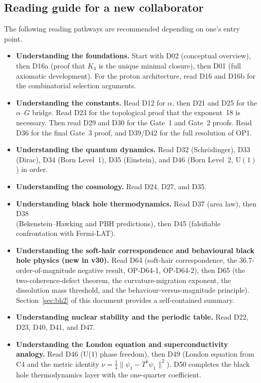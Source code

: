 \documentclass[11pt,a4paper]{article}
\theoremstyle{plain}
\theoremstyle{definition}
\theoremstyle{remark}
\begin{document}
\subsection{Reading guide for a new collaborator}
\label{subsec:readingguide}
The following reading pathways are recommended depending on one's entry point.

\begin{itemize}
\item \textbf{Understanding the foundations.} Start with D02 (conceptual overview), then D16a (proof that $K_4$ is the unique minimal closure), then D01 (full axiomatic development). For the proton architecture, read D16 and D16b for the combinatorial selection arguments.
\item \textbf{Understanding the constants.} Read D12 for $\alpha$, then D21 and D25 for the $\alpha$--$G$ bridge. Read D23 for the topological proof that the exponent~18 is necessary. Then read D29 and D30 for the Gate~1 and Gate~2 proofs. Read D36 for the final Gate~3 proof, and D39/D42 for the full resolution of OP1.
\item \textbf{Understanding the quantum dynamics.} Read D32 (Schr\"odinger), D33 (Dirac), D34 (Born Level~1), D35 (Einstein), and D46 (Born Level~2, $\mathrm{U}(1)$) in order.
\item \textbf{Understanding the cosmology.} Read D24, D27, and D35.
\item \textbf{Understanding black hole thermodynamics.} Read D37 (area law), then D38 \\ (Bekenstein--Hawking and PBH predictions), then D45 (falsifiable confrontation with Fermi-LAT).
\item \textbf{Understanding the soft-hair correspondence and behavioural black hole physics (new in v30).} Read D64 (soft-hair correspondence, the $36.7$-order-of-magnitude negative result, OP-D64-1, OP-D64-2), then D65 (the two-coherence-defect theorem, the curvature-migration exponent, the dissolution mass threshold, and the behaviour-versus-magnitude principle). Section~\ref{sec:bh2} of this document provides a self-contained summary.
\item \textbf{Understanding nuclear stability and the periodic table.} Read D22, D23, D40, D41, and D47.
\item \textbf{Understanding the London equation and superconductivity analogy.} Read D46 (U(1) phase freedom), then D49 (London equation from C4 and the metric identity $\nu = \tfrac{1}{4}\|\psi_1 - T^k\psi_1\|^2$). D50 completes the black hole thermodynamics layer with the one-quarter coefficient.

\end{itemize}
\end{document}
